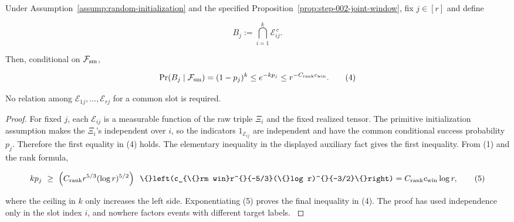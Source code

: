 \begin{lemma}\label{lem:step-003-slot-miss}
Under Assumption~\ref{assump:random-initialization} and the specified Proposition~\ref{prop:step-002-joint-window}, fix \(j\in[r]\) and define

\[
B_j:=\bigcap_{i=1}^k\mathscr E_{ij}^{\,c}.
\tag{3}
\]

Then, conditional on \(\mathcal F_{\rm sm}\),

\[
\Pr(B_j\mid\mathcal F_{\rm sm})=(1-p_j)^k
\le e^{-kp_j}
\le r^{-C_{\rm rank}c_{\rm win}}.
\tag{4}
\]

No relation among \(\mathscr E_{1j},\ldots,\mathscr E_{rj}\) for a common
slot is required.

\begin{proof}
For fixed \(j\), each \(\mathscr E_{ij}\) is a measurable function of the
raw triple \(\Xi_i\) and the fixed realized tensor. The primitive
initialization assumption makes the \(\Xi_i\)'s independent over \(i\), so
the indicators \(1_{\mathscr E_{ij}}\) are independent and have the common
conditional success probability \(p_j\). Therefore the first equality in
(4) holds. The elementary inequality in the displayed auxiliary fact gives the first
inequality. From (1) and the rank formula,

\[
kp_j\ \ge\ \left(C_{\rm rank}r^{5/3}(\log r)^{5/2}\right)
\texttt{   \textbackslash\{\}left(c\_\{\textbackslash\{\}rm win\}r\textasciicircum\{\}\{-5/3\}(\textbackslash\{\}log r)\textasciicircum\{\}\{-3/2\}\textbackslash\{\}right)}
 =C_{\rm rank}c_{\rm win}\log r,
\tag{5}
\]

where the ceiling in \(k\) only increases the left side. Exponentiating
(5) proves the final inequality in (4). The proof has used independence
only in the slot index \(i\), and nowhere factors events with different
target labels. \(\)


\end{proof}
\end{lemma}
